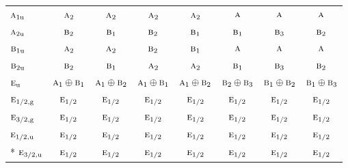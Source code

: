 \documentclass[10pt,a4paper]{article}
\numberwithin{equation}{section}
\newcommand{\irr}[1]{\text{\normalfont\scshape #1}}
\newcommand{\ptag}[1]{\mathrm{#1}}
\begin{document}
{\begin{longtable}{@{}lccccccc@{}}
$\irr{a}_{1\ptag{u}}$ & $\irr{a}_{2}$ & $\irr{a}_{2}$ & $\irr{a}_{2}$ & $\irr{a}_{2}$ & $\irr{a}$ & $\irr{a}$ & $\irr{a}$\\
$\irr{a}_{2\ptag{u}}$ & $\irr{b}_{2}$ & $\irr{b}_{1}$ & $\irr{b}_{2}$ & $\irr{b}_{1}$ & $\irr{b}_{1}$ & $\irr{b}_{3}$ & $\irr{b}_{2}$\\
$\irr{b}_{1\ptag{u}}$ & $\irr{a}_{2}$ & $\irr{a}_{2}$ & $\irr{b}_{2}$ & $\irr{b}_{1}$ & $\irr{a}$ & $\irr{a}$ & $\irr{a}$\\
$\irr{b}_{2\ptag{u}}$ & $\irr{b}_{2}$ & $\irr{b}_{1}$ & $\irr{a}_{2}$ & $\irr{a}_{2}$ & $\irr{b}_{1}$ & $\irr{b}_{3}$ & $\irr{b}_{2}$\\
$\irr{e}_{\ptag{u}}$ & $\irr{a}_{1}\oplus \irr{b}_{1}$ & $\irr{a}_{1}\oplus \irr{b}_{2}$ & $\irr{a}_{1}\oplus \irr{b}_{1}$ & $\irr{a}_{1}\oplus \irr{b}_{2}$ & $\irr{b}_{2}\oplus \irr{b}_{3}$ & $\irr{b}_{1}\oplus \irr{b}_{2}$ & $\irr{b}_{1}\oplus \irr{b}_{3}$\\
$\irr{e}_{1/2,\ptag{g}}$ & $\irr{e}_{1/2}$ & $\irr{e}_{1/2}$ & $\irr{e}_{1/2}$ & $\irr{e}_{1/2}$ & $\irr{e}_{1/2}$ & $\irr{e}_{1/2}$ & $\irr{e}_{1/2}$\\
$\irr{e}_{3/2,\ptag{g}}$ & $\irr{e}_{1/2}$ & $\irr{e}_{1/2}$ & $\irr{e}_{1/2}$ & $\irr{e}_{1/2}$ & $\irr{e}_{1/2}$ & $\irr{e}_{1/2}$ & $\irr{e}_{1/2}$\\
$\irr{e}_{1/2,\ptag{u}}$ & $\irr{e}_{1/2}$ & $\irr{e}_{1/2}$ & $\irr{e}_{1/2}$ & $\irr{e}_{1/2}$ & $\irr{e}_{1/2}$ & $\irr{e}_{1/2}$ & $\irr{e}_{1/2}$\\*
$\irr{e}_{3/2,\ptag{u}}$ & $\irr{e}_{1/2}$ & $\irr{e}_{1/2}$ & $\irr{e}_{1/2}$ & $\irr{e}_{1/2}$ & $\irr{e}_{1/2}$ & $\irr{e}_{1/2}$ & $\irr{e}_{1/2}$\\
\bottomrule\end{longtable}}
\end{document}
